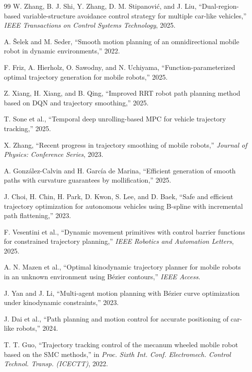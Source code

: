 \begin{thebibliography}{99}
W. Zhang, B. J. Shi, Y. Zhang, D. M. Stipanović, and J. Liu, ``Dual-region-based variable-structure avoidance control strategy for multiple car-like vehicles,'' \emph{IEEE Transactions on Control Systems Technology}, 2025.

A. Šelek and M. Seder, ``Smooth motion planning of an omnidirectional mobile robot in dynamic environments,'' 2022.

F. Friz, A. Hierholz, O. Sawodny, and N. Uchiyama, ``Function-parameterized optimal trajectory generation for mobile robots,'' 2025.

Z. Xiang, H. Xiang, and B. Qing, ``Improved RRT robot path planning method based on DQN and trajectory smoothing,'' 2025.

T. Sone et al., ``Temporal deep unrolling-based MPC for vehicle trajectory tracking,'' 2025.

X. Zhang, ``Recent progress in trajectory smoothing of mobile robots,'' \emph{Journal of Physics: Conference Series}, 2023.

A. González-Calvin and H. García de Marina, ``Efficient generation of smooth paths with curvature guarantees by mollification,'' 2025.

J. Choi, H. Chin, H. Park, D. Kwon, S. Lee, and D. Baek, ``Safe and efficient trajectory optimization for autonomous vehicles using B-spline with incremental path flattening,'' 2023.

F. Vesentini et al., ``Dynamic movement primitives with control barrier functions for constrained trajectory planning,'' \emph{IEEE Robotics and Automation Letters}, 2025.

A. N. Mazen et al., ``Optimal kinodynamic trajectory planner for mobile robots in an unknown environment using Bézier contours,'' \emph{IEEE Access}.

J. Yan and J. Li, ``Multi-agent motion planning with Bézier curve optimization under kinodynamic constraints,'' 2023.

J. Dai et al., ``Path planning and motion control for accurate positioning of car-like robots,'' 2024.

T. T. Guo, ``Trajectory tracking control of the mecanum wheeled mobile robot based on the SMC methods,'' in \emph{Proc. Sixth Int. Conf. Electromech. Control Technol. Transp. (ICECTT)}, 2022.


\end{thebibliography}

